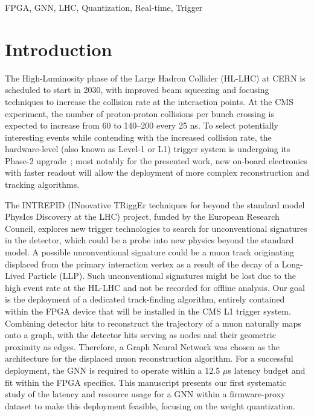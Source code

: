 \documentclass{IEEEtran}
\begin{document}
\begin{IEEEkeywords}
FPGA, GNN, LHC, Quantization, Real-time, Trigger
\end{IEEEkeywords}

\section{Introduction}
\label{sec:introduction}
The High-Luminosity phase of the Large Hadron Collider (HL-LHC) at CERN is scheduled to start in 2030, with improved beam squeezing and focusing techniques to increase the collision rate at the interaction points. At the CMS experiment, the number of proton-proton collisions per bunch crossing is expected to increase from 60 to 140--200 every 25 ns. To select potentially interesting events while contending with the increased collision rate, the hardware-level (also known as Level-1 or L1) trigger system is undergoing its Phase-2 upgrade~\cite{CERN-LHCC-2020-004}; most notably for the presented work, new on-board electronics with faster readout will allow the deployment of more complex reconstruction and tracking algorithms.

The INTREPID (INnovative TRiggEr techniques for beyond the standard model PhysIcs Discovery at the LHC) project, funded by the European Research Council, explores new trigger technologies to search for unconventional signatures in the detector, which could be a probe into new physics beyond the standard model.
A possible unconventional signature could be a muon track originating displaced from the primary interaction vertex as a result of the decay of a Long-Lived Particle (LLP). Such unconventional signatures might be lost due to the high event rate at the HL-LHC and not be recorded for offline analysis. Our goal is the deployment of a dedicated track-finding algorithm, entirely contained within the FPGA device that will be installed in the CMS L1 trigger system.
Combining detector hits to reconstruct the trajectory of a muon naturally maps onto a graph, with the detector hits serving as nodes and their geometric proximity as edges. Therefore, a Graph Neural Network was chosen as the architecture for the displaced muon reconstruction algorithm.
For a successful deployment, the GNN is required to operate within a 12.5 $\mu$s latency budget and fit within the FPGA specifics. This manuscript presents our first systematic study of the latency and resource usage for a GNN within a firmware-proxy dataset to make this deployment feasible, focusing on the weight quantization.
\end{document}
